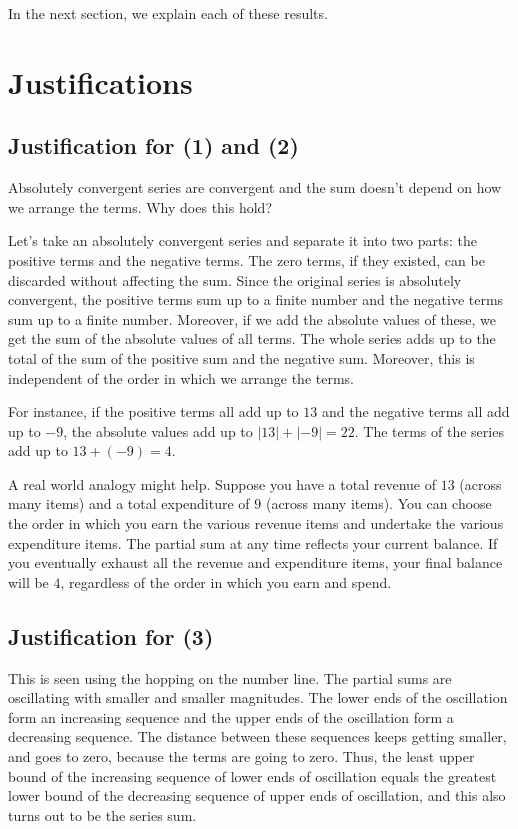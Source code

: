 \documentclass[10pt]{amsart}
\begin{document}
In the next section, we explain each of these results.

\section{Justifications}

\subsection{Justification for (1) and (2)}

Absolutely convergent series are convergent and the sum doesn't depend
on how we arrange the terms. Why does this hold?

Let's take an absolutely convergent series and separate it into two
parts: the positive terms and the negative terms. The zero terms, if
they existed, can be discarded without affecting the sum. Since the
original series is absolutely convergent, the positive terms sum up to
a finite number and the negative terms sum up to a finite
number. Moreover, if we add the absolute values of these, we get the
sum of the absolute values of all terms. The whole series adds up to
the total of the sum of the positive sum and the negative
sum. Moreover, this is independent of the order in which we arrange
the terms.

For instance, if the positive terms all add up to $13$ and the
negative terms all add up to $-9$, the absolute values add up to $|13|
+ |-9| = 22$. The terms of the series add up to $13 + (-9) = 4$.

A real world analogy might help. Suppose you have a total revenue of
$13$ (across many items) and a total expenditure of $9$ (across many
items). You can choose the order in which you earn the various revenue
items and undertake the various expenditure items. The partial sum at
any time reflects your current balance. If you eventually exhaust all
the revenue and expenditure items, your final balance will be $4$,
regardless of the order in which you earn and spend.

\subsection{Justification for (3)}

This is seen using the hopping on the number line. The partial sums
are oscillating with smaller and smaller magnitudes. The lower ends of
the oscillation form an increasing sequence and the upper ends of the
oscillation form a decreasing sequence. The distance between these
sequences keeps getting smaller, and goes to zero, because the terms
are going to zero. Thus, the least upper bound of the increasing
sequence of lower ends of oscillation equals the greatest lower bound
of the decreasing sequence of upper ends of oscillation, and this also
turns out to be the series sum.
\end{document}
